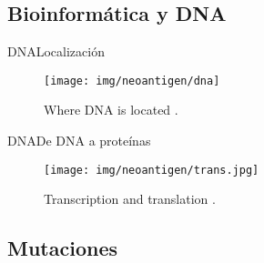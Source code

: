 \documentclass[10pt]{beamer}
\newcommand{\1}{
	\setbeamertemplate{background}{
		\texttt{[image: img/1]}
		\tikz[overlay] \fill[fill opacity=0.75,fill=white] (0,0) rectangle (-\paperwidth,\paperheight);
	}
}
\begin{document}
\subsection{Bioinformática y DNA}


\begin{frame}{DNA}{Localización}
	\begin{figure}[]
		\centering
		\texttt{[image: img/neoantigen/dna]}
		\label{img:mot2}
		\caption{Where DNA is located \cite{NCIdictionary2022}.}
	\end{figure}
\end{frame}



\begin{frame}{DNA}{De DNA a proteínas}
	\begin{figure}[]
		\centering
		\texttt{[image: img/neoantigen/trans.jpg]}
		\caption{Transcription and translation \cite{nci2020}.}
	\end{figure}
\end{frame}

\subsection{Mutaciones}
\end{document}
